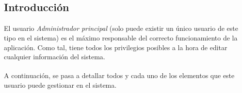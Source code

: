 \subsection{Introducción}

  \paragraph{}El usuario \textit{Administrador principal} (solo puede existir un
  único usuario de este tipo en el sistema) es el máximo responsable del
  correcto funcionamiento de la aplicación. Como tal, tiene todos los
  privilegios posibles a la hora de editar cualquier información del sistema.

  \paragraph{}A continuación, se pasa a detallar todos y cada uno de los
  elementos que este usuario puede gestionar en el sistema.